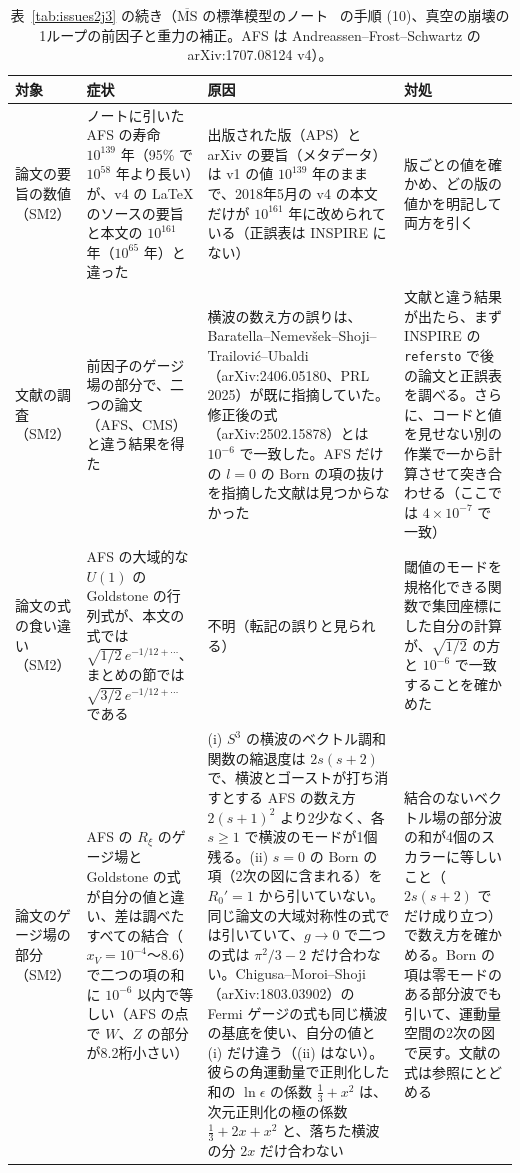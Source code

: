 \documentclass[a4paper,10pt]{ltjsarticle}
\begin{document}
\begin{table}[tbp]
\centering\footnotesize
\caption{表~\ref{tab:issues2j3} の続き（$\overline{\mathrm{MS}}$ の標準模型のノート~\cite{smmsbarnote} の手順 (10)、真空の崩壊の1ループの前因子と重力の補正。AFS は Andreassen--Frost--Schwartz の arXiv:1707.08124 v4）。}
\label{tab:issues2k}
\begin{tabularx}{\linewidth}{>{\raggedright\arraybackslash}p{2.4cm}>{\raggedright\arraybackslash}X>{\raggedright\arraybackslash}X>{\raggedright\arraybackslash}X}
\toprule
\textbf{対象} & \textbf{症状} & \textbf{原因} & \textbf{対処} \\
\midrule
論文の要旨の数値（SM2） & ノートに引いた AFS の寿命 $10^{139}$ 年（95\% で $10^{58}$ 年より長い）が、v4 の LaTeX のソースの要旨と本文の $10^{161}$ 年（$10^{65}$ 年）と違った & 出版された版（APS）と arXiv の要旨（メタデータ）は v1 の値 $10^{139}$ 年のままで、2018年5月の v4 の本文だけが $10^{161}$ 年に改められている（正誤表は INSPIRE にない） & 版ごとの値を確かめ、どの版の値かを明記して両方を引く \\
文献の調査（SM2） & 前因子のゲージ場の部分で、二つの論文（AFS、CMS）と違う結果を得た & 横波の数え方の誤りは、Baratella--Nemevšek--Shoji--Trailović--Ubaldi（arXiv:2406.05180、PRL 2025）が既に指摘していた。修正後の式（arXiv:2502.15878）とは $10^{-6}$ で一致した。AFS だけの $l=0$ の Born の項の抜けを指摘した文献は見つからなかった & 文献と違う結果が出たら、まず INSPIRE の \texttt{refersto} で後の論文と正誤表を調べる。さらに、コードと値を見せない別の作業で一から計算させて突き合わせる（ここでは $4\times10^{-7}$ で一致） \\
論文の式の食い違い（SM2） & AFS の大域的な $U(1)$ の Goldstone の行列式が、本文の式では $\sqrt{1/2}\,e^{-1/12+\cdots}$、まとめの節では $\sqrt{3/2}\,e^{-1/12+\cdots}$ である & 不明（転記の誤りと見られる） & 閾値のモードを規格化できる関数で集団座標にした自分の計算が、$\sqrt{1/2}$ の方と $10^{-6}$ で一致することを確かめた \\
論文のゲージ場の部分（SM2） & AFS の $R_\xi$ のゲージ場と Goldstone の式が自分の値と違い、差は調べたすべての結合（$x_V=10^{-4}$〜8.6）で二つの項の和に $10^{-6}$ 以内で等しい（AFS の点で $W$、$Z$ の部分が8.2桁小さい） & (i) $S^3$ の横波のベクトル調和関数の縮退度は $2s(s+2)$ で、横波とゴーストが打ち消すとする AFS の数え方 $2(s+1)^2$ より2少なく、各 $s\ge1$ で横波のモードが1個残る。(ii) $s=0$ の Born の項（2次の図に含まれる）を $R_0'=1$ から引いていない。同じ論文の大域対称性の式では引いていて、$g\to0$ で二つの式は $\pi^2/3-2$ だけ合わない。Chigusa--Moroi--Shoji（arXiv:1803.03902）の Fermi ゲージの式も同じ横波の基底を使い、自分の値と (i) だけ違う（(ii) はない）。彼らの角運動量で正則化した和の $\ln\epsilon$ の係数 $\frac13+x^2$ は、次元正則化の極の係数 $\frac13+2x+x^2$ と、落ちた横波の分 $2x$ だけ合わない & 結合のないベクトル場の部分波の和が4個のスカラーに等しいこと（$2s(s+2)$ でだけ成り立つ）で数え方を確かめる。Born の項は零モードのある部分波でも引いて、運動量空間の2次の図で戻す。文献の式は参照にとどめる \\

\end{tabularx}
\end{table}
\end{document}
